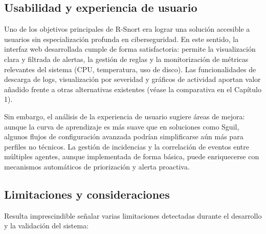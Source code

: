 \documentclass[11pt,a4paper,twoside]{report}
\begin{document}
\subsection{Usabilidad y experiencia de usuario}

Uno de los objetivos principales de R-Snort era lograr una solución accesible a usuarios sin especialización profunda en ciberseguridad. En este sentido, la interfaz web desarrollada cumple de forma satisfactoria: permite la visualización clara y filtrada de alertas, la gestión de reglas y la monitorización de métricas relevantes del sistema (CPU, temperatura, uso de disco). Las funcionalidades de descarga de logs, visualización por severidad y gráficos de actividad aportan valor añadido frente a otras alternativas existentes (véase la comparativa en el Capítulo 1).\newline

Sin embargo, el análisis de la experiencia de usuario sugiere áreas de mejora: aunque la curva de aprendizaje es más suave que en soluciones como Sguil, algunos flujos de configuración avanzada podrían simplificarse aún más para perfiles no técnicos. La gestión de incidencias y la correlación de eventos entre múltiples agentes, aunque implementada de forma básica, puede enriquecerse con mecanismos automáticos de priorización y alerta proactiva.

\subsection{Limitaciones y consideraciones}

Resulta imprescindible señalar varias limitaciones detectadas durante el desarrollo y la validación del sistema:
\end{document}
